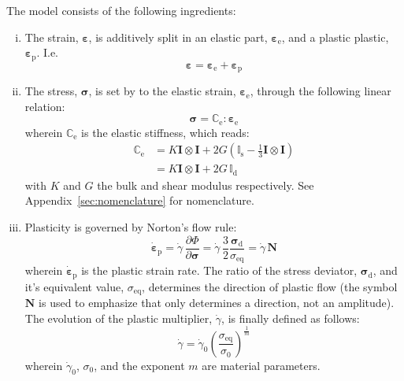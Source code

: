 \documentclass[times,namecite]{goose-article}
\begin{document}
The model consists of the following ingredients:
%
\begin{enumerate}[(i)]
%
\item The strain, $\bm{\varepsilon}$, is additively split in an elastic part, $\bm{\varepsilon}_\mathrm{e}$, and a plastic plastic, $\bm{\varepsilon}_\mathrm{p}$. I.e.
\begin{equation}
  \bm{\varepsilon} = \bm{\varepsilon}_\mathrm{e} + \bm{\varepsilon}_\mathrm{p}
\end{equation}
%
\item The stress, $\bm{\sigma}$, is set by to the elastic strain, $\bm{\varepsilon}_\mathrm{e}$, through the following linear relation:
\begin{equation}\label{eq:model:stress-elas}
  \bm{\sigma} = \mathbb{C}_\mathrm{e} : \bm{\varepsilon}_\mathrm{e}
\end{equation}
wherein $\mathbb{C}_\mathrm{e}$ is the elastic stiffness, which reads:
\begin{align}\label{eq:model:elas}
  \mathbb{C}_\mathrm{e}
  &= K \bm{I} \otimes \bm{I} + 2 G (  \mathbb{I}_\mathrm{s} - \tfrac{1}{3} \bm{I} \otimes \bm{I} )
  \\
  &= K \bm{I} \otimes \bm{I} + 2 G \, \mathbb{I}_\mathrm{d}
\end{align}
with $K$ and $G$ the bulk and shear modulus respectively. See Appendix~\ref{sec:nomenclature} for nomenclature.
%
\item Plasticity is governed by Norton's flow rule:
\begin{equation}\label{eq:model:epdot}
  \dot{\bm{\varepsilon}}_\mathrm{p}
  = \dot{\gamma} \, \frac{\partial \Phi}{\partial \bm{\sigma}}
  = \dot{\gamma} \, \frac{3}{2} \frac{\bm{\sigma}_\mathrm{d}}{\sigma_\mathrm{eq}}
  = \dot{\gamma} \, \bm{N}
\end{equation}
wherein $\dot{\bm{\varepsilon}}_\mathrm{p}$ is the plastic strain rate. The ratio of the stress deviator, $\bm{\sigma}_\mathrm{d}$, and it's equivalent value, $\sigma_\mathrm{eq}$, determines the direction of plastic flow (the symbol $\bm{N}$ is used to emphasize that only determines a direction, not an amplitude). The evolution of the plastic multiplier, $\dot{\gamma}$, is finally defined as follows:
\begin{equation}\label{eq:model:gammadot}
  \dot{\gamma}
  =
  \dot{\gamma}_0 \left( \frac{\sigma_\mathrm{eq}}{\sigma_0} \right)^{\frac{1}{m}}
\end{equation}
wherein $\dot{\gamma}_0$, $\sigma_0$, and the exponent $m$ are material parameters.
%
\end{enumerate}
\end{document}
